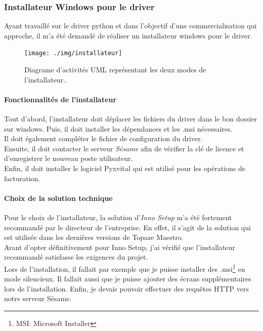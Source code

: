 \subsubsection{Installateur Windows pour le driver}
Ayant travaillé sur le driver python et dans l'objectif d'une commercialisation qui approche, il m'a été demandé de réaliser un installateur windows pour le driver.

\begin{figure}[H]
  \centering
  \texttt{[image: ./img/installateur]}
  \caption{\label{fig:installateur} Diagrame d'activités UML représentant les deux modes de l'installateur..}
\end{figure}

\paragraph*{Fonctionnalités de l'installateur\\}
Tout d'abord, l'installateur doit déplacer les fichiers du driver dans le bon dossier sur windows. Puis, il doit installer les dépendances et les .msi nécessaires.\\ 
Il doit également compléter le fichier de configuration du driver. \\
Ensuite, il doit contacter le serveur \textit{Sésame} afin de vérifier la clé de licence et d'enregistrer le nouveau poste utilisateur. \\
Enfin, il doit installer le logiciel Pyxvital qui est utilisé pour les opérations de facturation.


\paragraph*{Choix de la solution technique\\}
Pour le choix de l'installateur, la solution d'\textit{Inno Setup} m'a été fortement recommandé par le directeur de l'entreprise. En effet, il s'agit de la solution qui est utilisée dans les dernières versions de Topaze Maestro.\\
Avant d'opter définitivement pour Inno Setup, j'ai vérifié que l'installateur recommandé satisfasse les exigences du projet.\\ Lors de l'installation, il fallait par exemple que je puisse installer des .msi\footnote{MSI: Microsoft Installer} en mode silencieux. Il fallait aussi que je puisse ajouter des écrans supplémentaires lors de l'installation. Enfin, je devais pouvoir effectuer des requêtes HTTP vers notre serveur Sésame.

